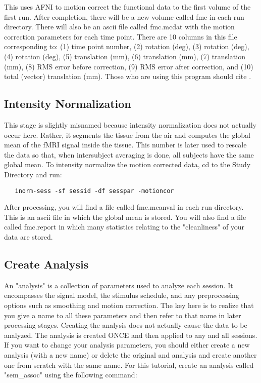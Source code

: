 \documentclass[12pt]{article}
\begin{document}
This uses AFNI to motion correct the functional data to the first
volume of the first run. After completion, there will be a new volume
called fmc in each run directory. There will also be an ascii file
called fmc.mcdat with the motion correction parameters for each time
point. There are 10 columns in this file corresponding to: (1) time
point number, (2) rotation (deg), (3) rotation (deg), (4) rotation
(deg), (5) translation (mm), (6) translation (mm), (7) translation
(mm), (8) RMS error before correction, (9) RMS error after correction,
and (10) total (vector) translation (mm). Those who are using this
program should cite \cite{Cox99}.

\subsection{Intensity Normalization}

This stage is slightly misnamed because intensity normalization does
not actually occur here. Rather, it segments the tissue from the air
and computes the global mean of the fMRI signal inside the
tissue. This number is later used to rescale the data so that, when
intersubject averaging is done, all subjects have the same global
mean. To intensity normalize the motion corrected data, cd to the
Study Directory and run:

\begin{verbatim}
   inorm-sess -sf sessid -df sesspar -motioncor
\end{verbatim}

After processing, you will find a file called fmc.meanval in each run
directory. This is an ascii file in which the global mean is
stored. You will also find a file called fmc.report in which many
statistics relating to the "cleanliness" of your data are stored.

\subsection{Create Analysis}
\label{mkanal.sec}

An "analysis" is a collection of parameters used to analyze each
session. It encompasses the signal model, the stimulus schedule, and
any preprocessing options such as smoothing and motion correction. The
key here is to realize that you give a name to all these parameters
and then refer to that name in later processing stages. Creating the
analysis does not actually cause the data to be analyzed. The analysis
is created ONCE and then applied to any and all sessions. If you want
to change your analysis parameters, you should either create a new
analysis (with a new name) or delete the original and analysis and
create another one from scratch with the same name. For this tutorial,
create an analysis called "sem\_assoc" using the following command:
\end{document}
